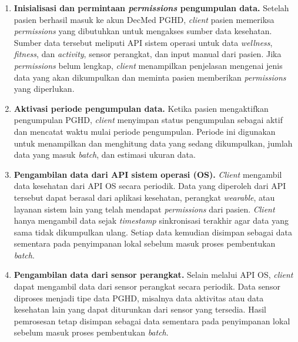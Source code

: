 \begin{enumerate}
    \item \textbf{Inisialisasi dan permintaan \textit{permissions} pengumpulan data.}
    Setelah pasien berhasil masuk ke akun DecMed PGHD, \textit{client} pasien memeriksa \textit{permissions} yang dibutuhkan untuk mengakses sumber data kesehatan. 
    Sumber data tersebut meliputi API sistem operasi untuk data \textit{wellness}, \textit{fitness}, dan \textit{activity}, sensor perangkat, dan input manual dari pasien. 
    Jika \textit{permissions} belum lengkap, \textit{client} menampilkan penjelasan mengenai jenis data yang akan dikumpulkan dan meminta pasien memberikan \textit{permissions} yang diperlukan.

    \item \textbf{Aktivasi periode pengumpulan data.}
    Ketika pasien mengaktifkan pengumpulan PGHD, \textit{client} menyimpan status pengumpulan sebagai aktif dan mencatat waktu mulai periode pengumpulan. 
    Periode ini digunakan untuk menampilkan dan menghitung data yang sedang dikumpulkan, jumlah data yang masuk \textit{batch}, dan estimasi ukuran data.

    \item \textbf{Pengambilan data dari API sistem operasi (OS).}
    \textit{Client} mengambil data kesehatan dari API OS secara periodik. 
    Data yang diperoleh dari API tersebut dapat berasal dari aplikasi kesehatan, perangkat \textit{wearable}, atau layanan sistem lain yang telah mendapat \textit{permissions} dari pasien. 
    \textit{Client} hanya mengambil data sejak \textit{timestamp} sinkronisasi terakhir agar data yang sama tidak dikumpulkan ulang. 
    Setiap data kemudian disimpan sebagai data sementara pada penyimpanan lokal sebelum masuk proses pembentukan \textit{batch}.

    \item \textbf{Pengambilan data dari sensor perangkat.}
    Selain melalui API OS, \textit{client} dapat mengambil data dari sensor perangkat secara periodik. 
    Data sensor diproses menjadi tipe data PGHD, misalnya data aktivitas atau data kesehatan lain yang dapat diturunkan dari sensor yang tersedia. 
    Hasil pemrosesan tetap disimpan sebagai data sementara pada penyimpanan lokal sebelum masuk proses pembentukan \textit{batch}.


\end{enumerate}
